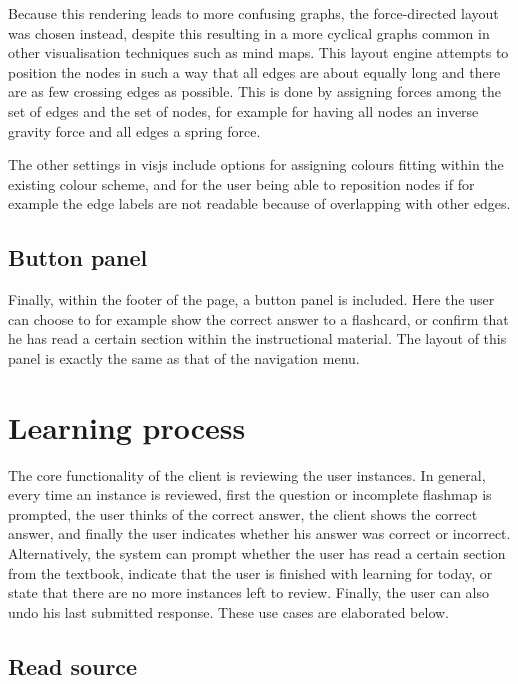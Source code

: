 Because this rendering leads to more confusing graphs, the force-directed layout was chosen instead, despite this resulting in a more cyclical graphs common in other visualisation techniques such as mind maps. This layout engine attempts to position the nodes in such a way that all edges are about equally long and there are as few crossing edges as possible. This is done by assigning forces among the set of edges and the set of nodes, for example for having all nodes an inverse gravity force and all edges a spring force.

The other settings in visjs include options for assigning colours fitting within the existing colour scheme, and for the user being able to reposition nodes if for example the edge labels are not readable because of overlapping with other edges.

\subsection{Button panel}

Finally, within the footer of the page, a button panel is included. Here the user can choose to for example show the correct answer to a flashcard, or confirm that he has read a certain section within the instructional material. The layout of this panel is exactly the same as that of the navigation menu.

\section{Learning process}
\label{sec:client_learning}

The core functionality of the client is reviewing the user instances. In general, every time an instance is reviewed, first the question or incomplete flashmap is prompted, the user thinks of the correct answer, the client shows the correct answer, and finally the user indicates whether his answer was correct or incorrect. Alternatively, the system can prompt whether the user has read a certain section from the textbook, indicate that the user is finished with learning for today, or state that there are no more instances left to review. Finally, the user can also undo his last submitted response. These use cases are elaborated below.

\subsection{Read source}

